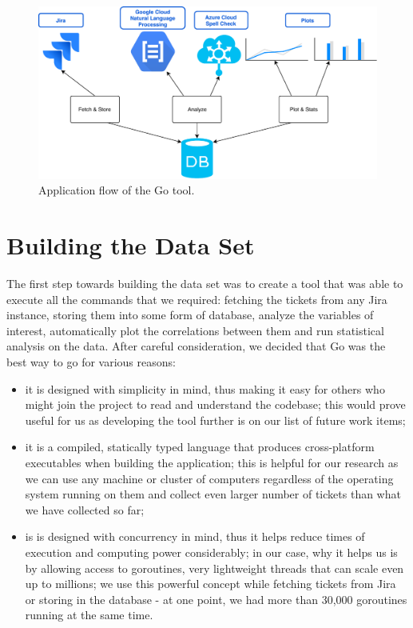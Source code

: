 \documentclass{mpaper}
\begin{document}
\begin{figure}
\begin{center}
\includegraphics[width=\textwidth]{images/flow.pdf}
\end{center}
\caption{\label{fig-eg}Application flow of the Go tool.}
\end{figure}

\section{Building the Data Set}\label{building}
The first step towards building the data set was to create a tool that was able to execute all the commands that we required:
fetching the tickets from any Jira instance, storing them into some form of database, analyze the variables of interest, 
automatically plot the correlations between them and run statistical analysis on the data. After careful consideration, 
we decided that Go was the best way to go for various reasons:
  \begin{itemize}
    \item it is designed with simplicity in mind, thus making it easy for others who might join the project to read 
    and understand the codebase; this would prove useful for us as developing the tool further is on our list of future 
    work items;
    \item it is a compiled, statically typed language that produces cross-platform executables when building the application;
    this is helpful for our research as we can use any machine or cluster of computers regardless of the operating system 
    running on them and collect even larger number of tickets than what we have collected so far;
    \item is is designed with concurrency in mind, thus it helps reduce times of execution and computing power considerably;
    in our case, why it helps us is by allowing access to goroutines, very lightweight threads that can scale even up to 
    millions; we use this powerful concept while fetching tickets from Jira or storing in the database - at one point, we had 
    more than 30,000 goroutines running at the same time.
  \end{itemize}
\end{document}
